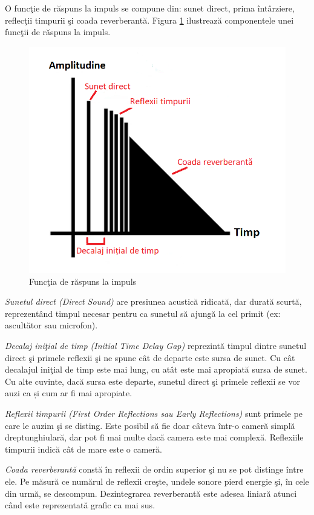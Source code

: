 	O func\c{t}ie de r\u{a}spuns la impuls se compune din: sunet direct, prima \^{i}nt\^{a}rziere, reflec\c{t}ii timpurii \c{s}i coada reverberant\u{a}. Figura \ref{Fig4} ilustreaz\u{a} componentele unei func\c{t}ii de r\u{a}spuns la impuls.
	
	\begin{figure}[!htb]
		\centering
		\includegraphics[width=0.7\linewidth]{imagini/impulseResponse.png}
		\caption{Func\c{t}ia de r\u{a}spuns la impuls}
		\label{Fig4}
	\end{figure}

	{\it{Sunetul direct (Direct Sound)}} are presiunea acustic\u{a} ridicat\u{a}, dar durat\u{a} scurt\u{a}, reprezent\^{a}nd timpul necesar pentru ca sunetul s\u{a} ajung\u{a} la cel primit (ex: ascult\u{a}tor sau microfon).
	 
	
	{\it{Decalaj ini\c{t}ial de timp (Initial Time Delay Gap)}}	reprezint\u{a} timpul dintre sunetul direct \c{s}i primele reflexii \c{s}i ne spune c\^{a}t de departe este sursa de sunet. Cu c\^{a}t decalajul ini\c{t}ial de timp este mai lung, cu at\^{a}t este mai apropiat\u{a} sursa de sunet. Cu alte cuvinte, dac\u{a} sursa este departe, sunetul direct \c{s}i primele reflexii se vor auzi ca și cum ar fi mai apropiate.
	 
	
	{\it{Reflexii timpurii (First Order Reflections sau Early Reflections)}} sunt primele pe care le auzim \c{s}i se disting. Este posibil s\u{a} fie doar c\^{a}teva \^{i}ntr-o camer\u{a} simpl\u{a} dreptunghiular\u{a}, dar pot fi mai multe dac\u{a} camera este mai complex\u{a}. Reflexiile timpurii indic\u{a} c\^{a}t de mare este o camer\u{a}.
	 
	
	{\it{Coada reverberant\u{a}}} const\u{a} \^{i}n reflexii de ordin superior \c{s}i nu se pot distinge \^{i}ntre ele. Pe m\u{a}sur\u{a} ce num\u{a}rul de reflexii cre\c{s}te, undele sonore pierd energie \c{s}i, \^{i}n cele din urm\u{a}, se descompun. Dezintegrarea reverberant\u{a} este adesea liniar\u{a} atunci c\^{a}nd este reprezentat\u{a} grafic ca mai sus. 
	
